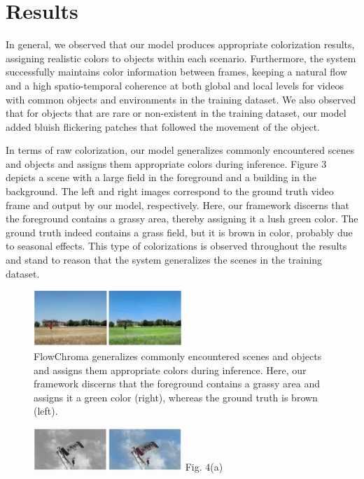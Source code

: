 \documentclass[10pt,twocolumn,letterpaper]{article}
\begin{document}
\section{Results}
In general, we observed that our model produces appropriate colorization results, assigning realistic colors to objects within each scenario. Furthermore, the system successfully maintains color information between frames, keeping a natural flow and a high spatio-temporal coherence at both global and local levels for videos with common objects and environments in the training dataset. We also observed that for objects that are rare or non-existent in the training dataset, our model added bluish flickering patches that followed the movement of the object.

In terms of raw colorization, our model generalizes commonly encountered scenes and objects and assigns them appropriate colors during inference. Figure 3 depicts a scene with a large field in the foreground and a building in the background. The left and right images correspond to the ground truth video frame and output by our model, respectively. Here, our framework discerns that the foreground contains a grassy area, thereby assigning it a lush green color. The ground truth indeed contains a grass field, but it is brown in color, probably due to seasonal effects. This type of colorizations is observed throughout the results and stand to reason that the system generalizes the scenes in the training dataset.

\begin{figure}[!h]
  \centering
  \includegraphics[width=0.5\textwidth]{original-fc-grass-building.jpg}
  \caption{FlowChroma generalizes commonly encountered scenes and objects and assigns them appropriate colors during inference. Here, our framework discerns that the foreground contains a grassy area and assigns it a green color (right), whereas the ground truth is brown (left).}
\end{figure}

\begin{figure}[!h]
  \centering
  \includegraphics[width=0.5\textwidth]{bw-fc-parachute.jpg}
  \label{}{\footnotesize Fig. 4(a)}
\end{figure}
\end{document}
